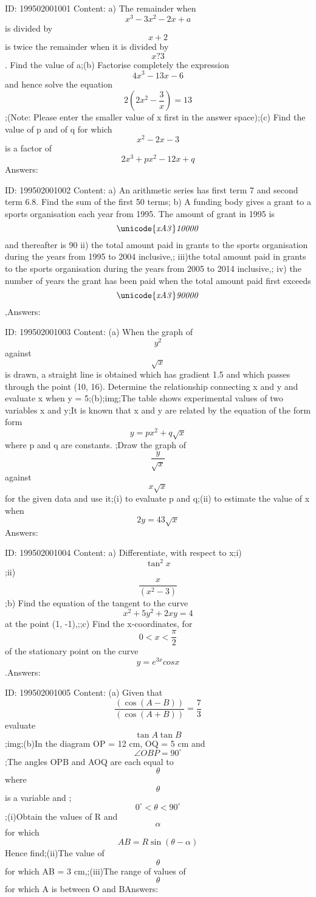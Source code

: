 \documentclass{article}
\begin{document}
ID: 199502001001
Content:
a) The remainder when \[x^{3}-3x^{2}-2x+a \] is divided by\[x + 2 \] is twice the remainder when it is divided by \[x ? 3\].  Find the value of a;(b) Factorise completely the expression \[4x^{3}-13x-6\]  and hence solve the equation \[2\left ( 2x^{2}-\frac{3}{x} \right )=13\];(Note: Please enter the smaller value of x first in the answer space);(c) Find the value of p and of q for which \[x^{2}-2x-3\]  is a factor of \[2x^{3}+px^{2}-12x+q\]Answers:

ID: 199502001002
Content:
a) An arithmetic series has first term 7 and second term 6.8. Find the sum of the first 50 terms; b) A funding body gives a grant to a sports organisation each year from 1995. The amount of grant in 1995 is \[\it\unicode{xA3} 10000\] and thereafter is 90%
ii) the total amount paid in grants to the sports organisation during the years from 1995 to 2004 inclusive,;
iii)the total amount paid in grants to the sports organisation during the years from 2005 to 2014 inclusive,;
iv) the number of years the grant has been paid when the total amount paid first exceeds \[\it\unicode{xA3} 90000\],Answers:

ID: 199502001003
Content:
(a) When the graph of \[y^{2}\]  against \[\sqrt{x}\]  is drawn, a straight line is obtained which has gradient 1.5 and which passes through the point (10, 16). Determine the relationship connecting x and y and evaluate x when y = 5;(b);img;The table shows experimental values of two variables x and y;It is known that x and y are related by the equation of the form form \[y = px^{2}+ q\sqrt{x}\] where p and q are constants. ;Draw the graph of \[\frac{y}{\sqrt{x}}\]  against \[x\sqrt{x}\]  for the given data and use it;(i) to evaluate p and q;(ii) to estimate the value of x when \[2y = 43\sqrt{x}\]Answers:

ID: 199502001004
Content:
a) Differentiate, with respect to x;i) \[\tan ^{2}x\];ii)\[\frac{x}{\left ( x^{2}-3 \right )}\];b) Find the equation of the tangent to the curve \[x^{2}+5y^{2}+2xy = 4 \]  at the point (1, -1),;;c) Find the x-coordinates, for \[0<x<\frac{\pi }{2}\] of the stationary point on the curve \[y = e ^{3x} cosx\].Answers:

ID: 199502001005
Content:
(a) Given that \[\frac{\left ( \cos \left (A-B  \right ) \right )}{\left ( \cos \left ( A+B \right ) \right )}= \frac{7}{3}\] evaluate \[\tan A\tan B\];img;(b)In the diagram OP = 12 cm, OQ = 5 cm and \[\angle OBP=90^{\circ}\];The angles OPB and AOQ are each equal to \[\theta\] where \[\theta\] is a variable and ;\[0^{\circ}< \theta < 90^{\circ}\];(i)Obtain the values of R and \[\alpha\] for which \[AB = R\sin \left ( \theta -\alpha  \right )\] Hence find;(ii)The value of \[\theta\] for which AB = 3 cm,;(iii)The range of values of \[\theta \]  for which A is between O and BAnswers:
\end{document}
